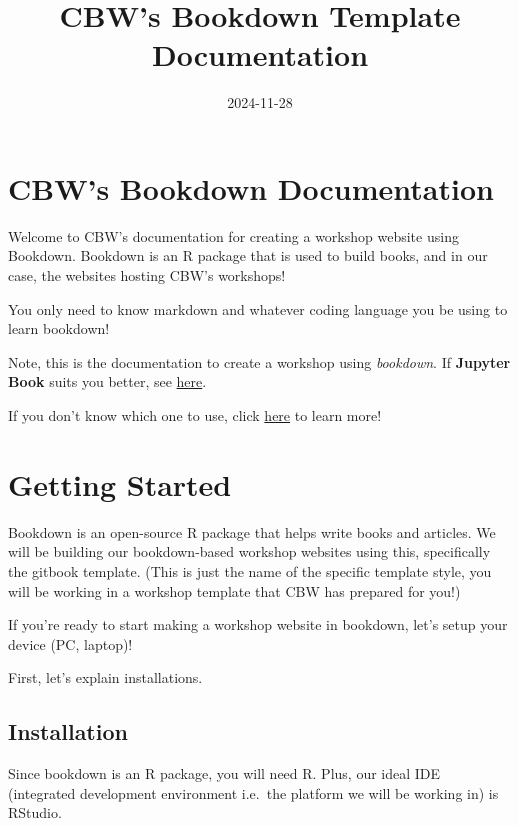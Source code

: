 \documentclass[
]{book}
\title{CBW's Bookdown Template Documentation}
\author{}
\date{\vspace{-2.5em}2024-11-28}
\theoremstyle{definition}
\theoremstyle{definition}
\theoremstyle{definition}
\theoremstyle{definition}
\theoremstyle{remark}
\begin{document}
\maketitle

{
\setcounter{tocdepth}{1}
\tableofcontents
}
\chapter{CBW's Bookdown Documentation}\label{cbws-bookdown-documentation}

Welcome to CBW's documentation for creating a workshop website using Bookdown. Bookdown is an R package that is used to build books, and in our case, the websites hosting CBW's workshops!

You only need to know markdown and whatever coding language you be using to learn bookdown!

Note, this is the documentation to create a workshop using \emph{bookdown}. If \textbf{Jupyter Book} suits you better, see \href{https://cbw-dev.github.io/jupyterbook-docs/}{here}.

If you don't know which one to use, click \href{}{here} to learn more!

\chapter{Getting Started}\label{getting-started}

Bookdown is an open-source R package that helps write books and articles. We will be building our bookdown-based workshop websites using this, specifically the gitbook template. (This is just the name of the specific template style, you will be working in a workshop template that CBW has prepared for you!)

If you're ready to start making a workshop website in bookdown, let's setup your device (PC, laptop)!

First, let's explain installations.

\section{Installation}\label{installation}

Since bookdown is an R package, you will need R. Plus, our ideal IDE (integrated development environment i.e.~the platform we will be working in) is RStudio.
\end{document}
